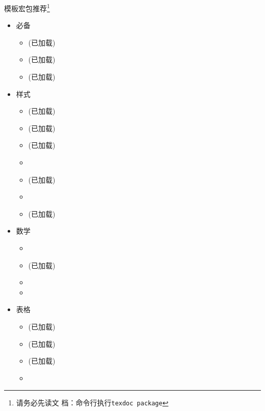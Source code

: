 \documentclass[xcolor=svgnames, t, aspectratio=169]{ctexbeamer}
\begin{document}
\begin{frame}{\nwafuthesis 模板}{宏包推荐\footnote[frame]{请务必先读文
      档：命令行执行\alert{\texttt{texdoc package}}}}
  \stretchon
  \footnotesize
  \setlength{\leftmarginii}{1.5em}
  \vspace{-18ex}
  \begin{multicols}{3}
    \begin{itemize}
    \item 必备

      \begin{itemize}
      \item {}(已加载)
      \item {}(已加载)
      \item {}(已加载)
      \end{itemize}

    \item 样式

      \begin{itemize}
      \item {}(已加载)
      \item {}(已加载)
      \item {}(已加载)
      \item {}
      \item {}(已加载)
      \item {}
      \item {}(已加载)
      \end{itemize}

    \item 数学

      \begin{itemize}
      \item {}
      \item {}(已加载)
      \item {}
      \item {}
      \end{itemize}

    \item 表格

      \begin{itemize}
      \item {}(已加载)
      \item {}(已加载)
      \item {}(已加载)
      \item {}
      \end{itemize}


\end{itemize}
\end{multicols}
\end{frame}
\end{document}
